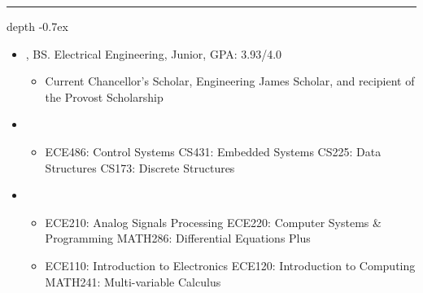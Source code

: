 \documentclass[10pt,letterpaper]{article}
\def\Vhrulefill{\leavevmode\leaders\hrule height 0.7ex depth \dimexpr0.4pt-0.7ex\hfill\kern0pt}
\begin{document}
%
%


\vspace{-.78mm}
\noindent \large{}  \Vhrulefill
\vspace{-.7mm}


\begin{itemize}[label={}]
 \item \small{, BS. Electrical Engineering, Junior, GPA: 3.93/4.0 \hfill {}}
 \vspace{-1.58mm}
 \begin{itemize}[label={}]
 	\item \small{Current Chancellor's Scholar, Engineering James Scholar, and recipient of the Provost Scholarship}
 \end{itemize}


 \item \small{}
 \vspace{-1.58mm}
 \begin{itemize}[label={}]
 	\item \small{ECE486: Control Systems \hspace{3mm} CS431: Embedded Systems \hspace{3mm} CS225: Data Structures \hspace{3mm} CS173: Discrete Structures}
 \end{itemize}

 \item \small{}
 \vspace{-1.58mm}
 \begin{itemize}[label={}]
 	\item \small{ECE210: Analog Signals Processing \hspace{3mm} ECE220: Computer Systems & Programming \hspace{3mm} MATH286: Differential Equations Plus \hspace{3mm} }
 	\item \small{ECE110: Introduction to Electronics \hspace{2.7mm} ECE120: Introduction to Computing \hspace{11.7mm} MATH241: Multi-variable Calculus}
 \end{itemize}

\end{itemize}
\end{document}
